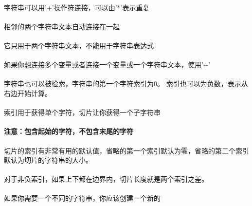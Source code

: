 \documentclass{article}
\begin{document}
\begin{CJK}{UTF8}{gbsn}
\paragraph{}
字符串可以用'+'操作符连接，可以由'*'表示重复
\paragraph{}
相邻的两个字符串文本自动连接在一起
\paragraph{}
它只用于两个字符串文本，不能用于字符串表达式
\paragraph{}
如果你想连接多个变量或者连接一个变量或一个字符串文本，使用'+'
\paragraph{}
字符串也可以被检索，字符串的第一个字符索引为0。
索引也可以为负数，表示从右边开始计算。
\paragraph{}
索引用于获得单个字符，切片让你获得一个子字符串
\paragraph{}
\textbf{注意：包含起始的字符，不包含末尾的字符}
\paragraph{}
切片的索引有非常有用的默认值，省略的第一个索引默认为零，省略的第二个索引默认为切片的字符串的大小。
\paragraph{}
对于非负索引，如果上下都在边界内，切片长度就是两个索引之差。
\paragraph{}
{\color{green}{Python字符串不可以被更改——它们是不可变的。因此，赋值给字符串索引的位置会导致错误}}
\paragraph{}
如果你需要一个不同的字符串，你应该创建一个新的
\paragraph{}
{\color{red}{内置函数len()返回字符串长度}}

\end{CJK}
\end{document}
